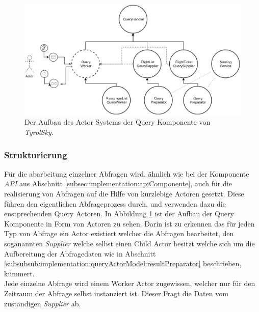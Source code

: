 \begin{figure}
    \centering
    \includegraphics[width=\linewidth]{gfx/implementation/QueringServiceActorModel}
    \caption{Der Aufbau des Actor Systems der Query Komponente von \textit{TyrolSky}.}
    \label{fig:implementation:queryActorModel}
\end{figure} 

\subsubsection{Strukturierung}
Für die abarbeitung einzelner Abfragen wird, ähnlich wie bei der Komponente \textit{API} aus Abschnitt \ref{subsec:implementation:apiComponente}, auch für die realisierung von Abfragen auf die Hilfe von kurzlebige Actoren gesetzt. Diese führen den eigentlichen Abfrageprozess durch, und verwenden dazu die enstprechenden Query Actoren. In Abbildung \ref{fig:implementation:queryActorModel} ist der Aufbau der Query Komponente in Form von Actoren zu sehen. Darin ist zu erkennen das für jeden Typ von Abfrage ein Actor existiert welcher die Abfragen bearbeitet, den soganannten \textit{Supplier} welche selbst einen Child Actor besitzt welche sich um die Aufbereitung der Abfragedaten wie in Abschnitt \ref{subsubsub:implementation:queryActorModel:resultPreparator} beschrieben, kümmert. \\
Jede einzelne Abfrage wird einem Worker Actor zugewissen, welcher nur für den Zeitraum der Abfrage selbst instanziert ist. Dieser Fragt die Daten vom zuständigen \textit{Supplier} ab. 













